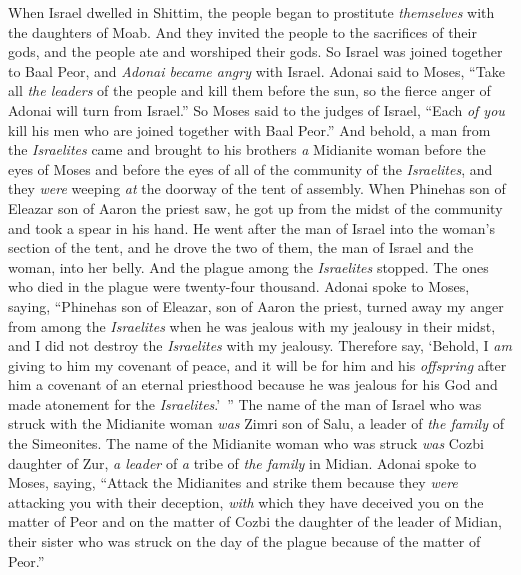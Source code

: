 \begin{biblechapter} %
 When Israel dwelled in Shittim, the people began to prostitute \textit{themselves} with the daughters of Moab.
\verse And they invited the people to the sacrifices of their gods, and the people ate and worshiped their gods.
\verse So Israel was joined together to Baal Peor, and \textit{Adonai became angry} with Israel.
\verse Adonai said to Moses, “Take all \textit{the leaders} of the people and kill them before the sun, so the fierce anger of Adonai will turn from Israel.”
\verse So Moses said to the judges of Israel, “Each \textit{of you} kill his men who are joined together with Baal Peor.”
\verse And behold, a man from the \textit{Israelites} came and brought to his brothers \textit{a} Midianite woman before the eyes of Moses and before the eyes of all of the community of the \textit{Israelites}, and they \textit{were} weeping \textit{at} the doorway of the tent of assembly.
\verse When Phinehas son of Eleazar son of Aaron the priest saw, he got up from the midst of the community and took a spear in his hand.
\verse He went after the man of Israel into the woman’s section of the tent, and he drove the two of them, the man of Israel and the woman, into her belly. And the plague among the \textit{Israelites} stopped.
\verse The ones who died in the plague were twenty-four thousand.
\verse Adonai spoke to Moses, saying,
\verse “Phinehas son of Eleazar, son of Aaron the priest, turned away my anger from among the \textit{Israelites} when he was jealous with my jealousy in their midst, and I did not destroy the \textit{Israelites} with my jealousy.
\verse Therefore say, ‘Behold, I \textit{am} giving to him my covenant of peace,
\verse and it will be for him and his \textit{offspring} after him a covenant of an eternal priesthood because he was jealous for his God and made atonement for the \textit{Israelites}.’ ”
\verse The name of the man of Israel who was struck with the Midianite woman \textit{was} Zimri son of Salu, a leader of \textit{the family} of the Simeonites.
\verse The name of the Midianite woman who was struck \textit{was} Cozbi daughter of Zur, \textit{a leader} of \textit{a} tribe of \textit{the family} in Midian.
\verse Adonai spoke to Moses, saying,
\verse “Attack the Midianites and strike them
\verse because they \textit{were} attacking you with their deception, \textit{with} which they have deceived you on the matter of Peor and on the matter of Cozbi the daughter of the leader of Midian, their sister who was struck on the day of the plague because of the matter of Peor.”
\end{biblechapter}


